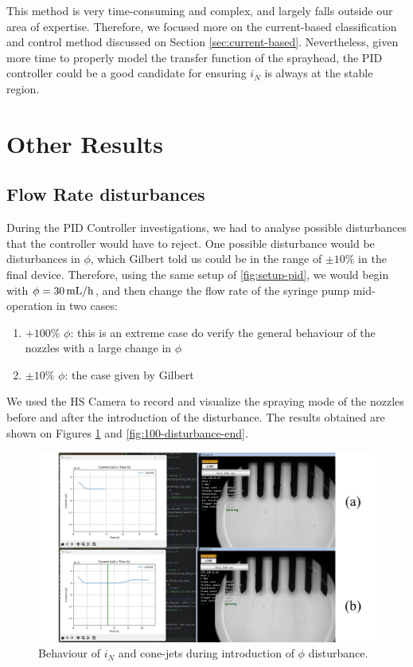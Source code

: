 \documentclass[oneside,12pt]{article}
\begin{document}
This method is very time-consuming and complex, and largely falls outside our area of expertise. Therefore, we focused
more on the current-based classification and control method discussed on Section \ref{sec:current-based}. Nevertheless, 
given more time to properly model the transfer function of the sprayhead, the PID controller could be a good candidate 
for ensuring $i_N$ is always at the stable region.

\section{Other Results}\label{sec:utils}

\subsection{Flow Rate disturbances}

During the PID Controller investigations, we had to analyse possible disturbances that the controller would have to reject.
One possible disturbance would be disturbances in $\phi$, which Gilbert told us could be in the range of $\pm 10\%$ in the
final device. Therefore, using the same setup of \autoref{fig:setup-pid}, we would begin with $\phi = 30 \,\mathrm{mL/h}$, and then 
change the flow rate of the syringe pump mid-operation in two cases:

\begin{enumerate}
    \item $+ 100\% \,\, \phi$: this is an extreme case do verify the general behaviour of the nozzles with a large change in $\phi$
    \item $\pm 10\%  \,\,\phi$: the case given by Gilbert
\end{enumerate}

We used the HS Camera to record and visualize the spraying mode of the nozzles before and after the introduction of the disturbance.
The results obtained are shown on Figures \ref{fig:100-disturbance-start} and \ref{fig:100-disturbance-end}.

\begin{figure}[h!]
    \centering
    \includegraphics[width=\textwidth,trim=1 1 1 1,clip]{figures/100-disturbance-start.png}
    \caption{Behaviour of $i_N$ and cone-jets during introduction of $\phi$ disturbance.}
    \label{fig:100-disturbance-start}
\end{figure}
\end{document}
